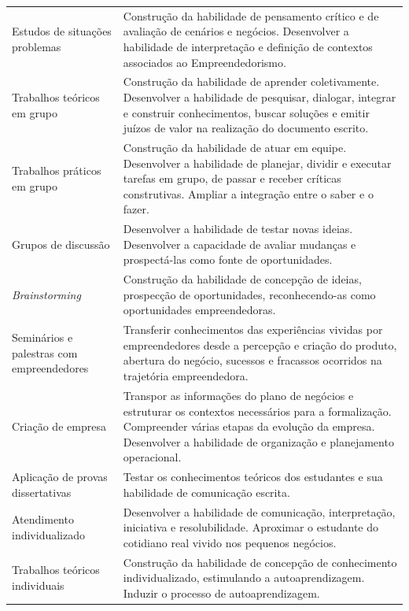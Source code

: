 \begin{longtable}{p{3.5cm}p{11.0cm}}
Estudos de situações problemas & Construção da habilidade de pensamento crítico e de avaliação de cenários e
negócios. Desenvolver a habilidade de interpretação e definição de contextos associados ao Empreendedorismo. \\ 

Trabalhos teóricos em grupo & Construção da habilidade de aprender coletivamente. Desenvolver a
habilidade de pesquisar, dialogar, integrar e construir conhecimentos,
buscar soluções e emitir juízos de valor na realização do documento escrito. \\ 

Trabalhos práticos em grupo & Construção da habilidade de atuar em equipe. Desenvolver a habilidade de planejar, dividir e executar tarefas em grupo, de passar e receber críticas construtivas. Ampliar a integração entre o saber e o fazer.  \\ 

Grupos de discussão & Desenvolver a habilidade de testar novas ideias. Desenvolver a capacidade de avaliar mudanças e prospectá-las como fonte de oportunidades. \\ 
 
\textit{Brainstorming}  & Construção da habilidade de concepção de ideias, prospecção de
oportunidades, reconhecendo-as como oportunidades empreendedoras. \\ 


Seminários e palestras com empreendedores & Transferir conhecimentos das experiências vividas por empreendedores
desde a percepção e criação do produto, abertura do negócio, sucessos e
fracassos ocorridos na trajetória empreendedora. \\ 

Criação de empresa & Transpor as informações do plano de negócios e estruturar os contextos necessários para a formalização. Compreender várias etapas da evolução da empresa. Desenvolver a habilidade de organização e planejamento operacional. \\ 

Aplicação de provas dissertativas & Testar os conhecimentos teóricos dos estudantes e sua habilidade de
comunicação escrita. \\ 

Atendimento individualizado & Desenvolver a habilidade de comunicação, interpretação, iniciativa e
resolubilidade. Aproximar o estudante do cotidiano real vivido nos pequenos negócios. \\ 

Trabalhos teóricos individuais & Construção da habilidade de concepção de conhecimento individualizado,
estimulando a autoaprendizagem. Induzir o processo de autoaprendizagem. \\ 


\end{longtable}
